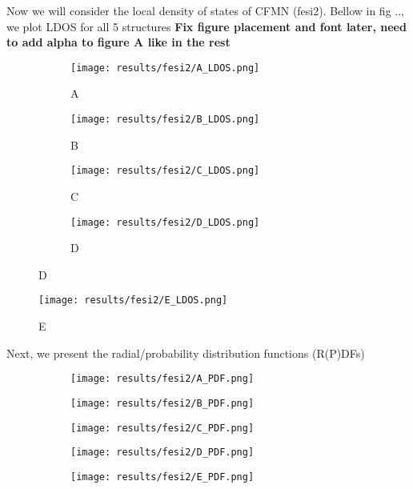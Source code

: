 Now we will consider the local density of states of CFMN (fesi2). Bellow in fig .., we plot LDOS for all 5 structures \textbf{Fix figure placement and font later, need to add alpha to figure A like in the rest}
\newpage
\begin{figure}[H]
	\begin{subfigure}{\textwidth}
		\texttt{[image: results/fesi2/A\_LDOS.png]}
		\caption{A}
	\end{subfigure}
	\begin{subfigure}{\textwidth}
		\texttt{[image: results/fesi2/B\_LDOS.png]}
		\caption{B}
	\end{subfigure}
	\begin{subfigure}{\textwidth}
		\texttt{[image: results/fesi2/C\_LDOS.png]}
		\caption{C}
	\end{subfigure}
	\begin{subfigure}{\textwidth}
		\texttt{[image: results/fesi2/D\_LDOS.png]}
		\caption{D}
	\end{subfigure}
\end{figure}		
\begin{figure}[H]
	\texttt{[image: results/fesi2/E\_LDOS.png]}
	\caption{E}
\end{figure}

Next, we present the radial/probability distribution functions (R(P)DFs)

\begin{figure}[H]
	\begin{subfigure}{\textwidth}
		\texttt{[image: results/fesi2/A\_PDF.png]}
	\end{subfigure}	
	\begin{subfigure}{\textwidth}
		\texttt{[image: results/fesi2/B\_PDF.png]}
	\end{subfigure}
	\begin{subfigure}{\textwidth}
		\texttt{[image: results/fesi2/C\_PDF.png]}
	\end{subfigure}
\end{figure}
\begin{figure}[H]
	\begin{subfigure}{\textwidth}
		\texttt{[image: results/fesi2/D\_PDF.png]}
	\end{subfigure}
	\begin{subfigure}{\textwidth}
		\texttt{[image: results/fesi2/E\_PDF.png]}
	\end{subfigure}
\end{figure}

